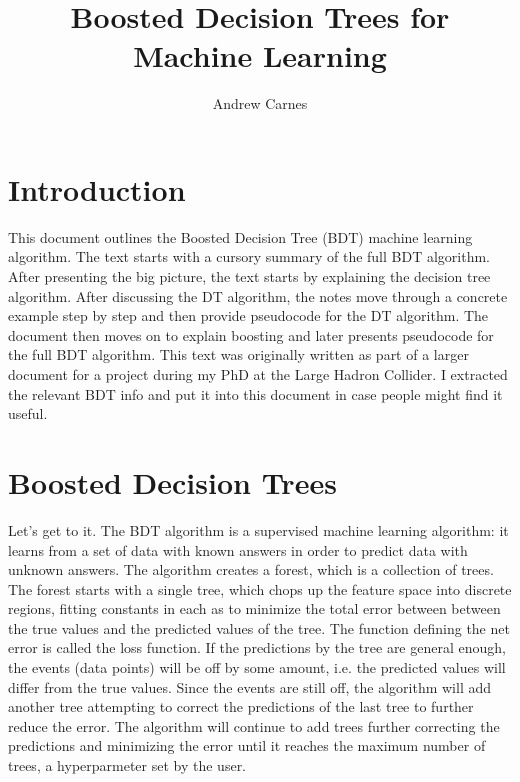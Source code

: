 \documentclass[12pt]{article}
\begin{document}
\title{Boosted Decision Trees for Machine Learning}
\author{Andrew Carnes}

\maketitle 

\newpage
\tableofcontents
\newpage

\section{Introduction}

This document outlines the Boosted Decision Tree (BDT) machine learning algorithm. The text starts with a cursory summary of the full BDT algorithm. After presenting the big picture, the text starts by explaining the decision tree algorithm. After discussing the DT algorithm, the notes move through a concrete example step by step and then provide pseudocode for the DT algorithm.  The document then moves on to explain boosting and later presents pseudocode for the full BDT algorithm. This text was originally written as part of a larger document for a project during my PhD at the Large Hadron Collider. I extracted the relevant BDT info and put it into this document in case people might find it useful.

\section{Boosted Decision Trees}

Let's get to it. The BDT algorithm is a supervised machine learning algorithm: it learns from a set of data with known answers in order to predict data with unknown answers. The algorithm creates a forest, which is a collection of trees. The forest starts with a single tree, which chops up the feature space into discrete regions, fitting constants in each as to minimize the total error between between the true values and the predicted values of the tree. The function defining the net error is called the loss function. If the predictions by the tree are general enough, the events (data points) will be off by some amount, i.e. the predicted values will differ from the true values. Since the events are still off, the algorithm will add another tree attempting to correct the predictions of the last tree to further reduce the error. The algorithm will continue to add trees further correcting the predictions and minimizing the error until it reaches the maximum number of trees, a hyperparmeter set by the user. 
\end{document}
